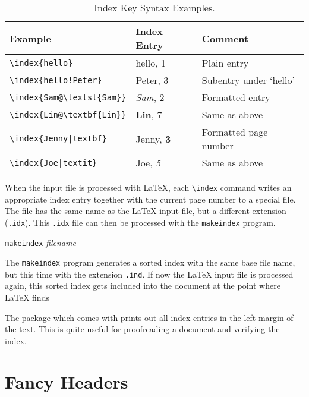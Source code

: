 \begin{table}[!tp]
\caption{Index Key Syntax Examples.}
\label{index}
\begin{center}
\begin{tabular}{@{}lll@{}}
  \textbf{Example} &\textbf{Index Entry} &\textbf{Comment}\\\hline
  \rule{0pt}{1.05em}\verb|\index{hello}| &hello, 1 &Plain entry\\ 
\verb|\index{hello!Peter}|   &\hspace*{2ex}Peter, 3 &Subentry under `hello'\\ 
\verb|\index{Sam@\textsl{Sam}}|     &\textsl{Sam}, 2& Formatted entry\\ 
\verb|\index{Lin@\textbf{Lin}}|     &\textbf{Lin}, 7& Same as above\\ 
\verb.\index{Jenny|textbf}.     &Jenny, \textbf{3}& Formatted page number\\
\verb.\index{Joe|textit}.     &Joe, \textit{5}& Same as above
\end{tabular}
\end{center}
\end{table}

When the input file is processed with \LaTeX{}, each \verb|\index|
command writes an appropriate index entry together with the current
page number to a special file. The file has the same name as the
\LaTeX{} input file, but a different extension (\verb|.idx|). This
\texttt{.idx} file can then be processed with the \texttt{makeindex}
program.

\begin{lscommand}
  \texttt{makeindex} \emph{filename}
\end{lscommand}
The \texttt{makeindex} program generates a sorted index with the same base
file name, but this time with the extension \texttt{.ind}. If now the
\LaTeX{} input file is processed again, this sorted index gets
included into the document at the point where \LaTeX{} finds
\begin{lscommand}
\end{lscommand}

The  package which comes with \LaTeXe{} prints out all
index entries in the left margin of the text. This is quite useful for
proofreading a document and verifying the index.
   
\section{Fancy Headers}
\label{sec:fancy}

